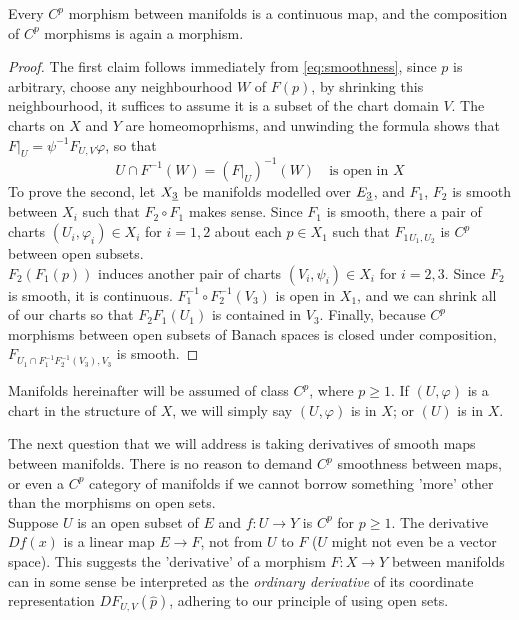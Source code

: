 \documentclass[../main-manifolds.tex]{subfiles}
\begin{document}
%

\begin{wts}\label{prop:smoothness-implies-cont-functorality}
    Every $C^p$ morphism between manifolds is a continuous map, and the composition of $C^p$ morphisms is again a morphism.
\end{wts}
\begin{proof}
    The first claim follows immediately from \cref{eq:smoothness}, since $p$ is arbitrary, choose any neighbourhood $W$ of $F(p)$, by shrinking this neighbourhood, it suffices to assume it is a subset of the chart domain $V$. The charts on $X$ and $Y$ are homeomoprhisms, and unwinding the formula shows that $F\vert_{U} = \psi^{-1}F_{U,V}\varphi$, so that
    \[
        U\cap F^{-1}(W) = (F\vert_U)^{-1}(W)\quad\text{is open in }X
    \]
    To prove the second, let $\UL{X}[3]$ be manifolds modelled over $\UL{E}[3]$, and $F_1$, $F_2$ is smooth between $X_i$ such that $F_2\circ F_1$ makes sense. Since $F_1$ is smooth, there a pair of charts $(U_i,\varphi_i)\in X_i$ for $i = 1,2$ about each $p\in X_1$ such that $F_1{_{U_1,U_2}}$ is $C^p$ between open subsets.\\

    $F_2(F_1(p))$ induces another pair of charts $(V_i,\psi_i)\in X_i$ for $i=2,3$. Since $F_2$ is smooth, it is continuous. $F_1^{-1}\circ F_2^{-1}(V_3)$ is open in $X_1$, and we can shrink all of our charts so that $F_2F_1(U_1)$ is contained in $V_3$. Finally, because $C^p$ morphisms between open subsets of Banach spaces is closed under composition, $F_{U_1\cap F_1^{-1}F_2^{-1}(V_3), V_3}$ is smooth.
\end{proof}
\begin{remark}
    Manifolds hereinafter will be assumed of class $C^p$, where $p\geq 1$. If $(U,\varphi)$ is a chart in the structure of $X$, we will simply say $(U,\varphi)$ is in $X$; or $(U)$ is in $X$.
\end{remark}
The next question that we will address is taking derivatives of smooth maps between manifolds. There is no reason to demand $C^p$ smoothness between maps, or even a $C^p$ category of manifolds if we cannot borrow something 'more' other than the morphisms on open sets.\\

Suppose $U$ is an open subset of $E$ and $f: U\to Y$ is $C^p$ for $p\geq 1$. The derivative $Df(x)$ is a linear map $E\to F$, not from $U$ to $F$ ($U$ might not even be a vector space). This suggests the 'derivative' of a morphism $F: X\to Y$ between manifolds can in some sense be interpreted as the \emph{ordinary derivative} of its coordinate representation $DF_{U,V}(\hat{p})$, adhering to our principle of using open sets.\\
\end{document}
